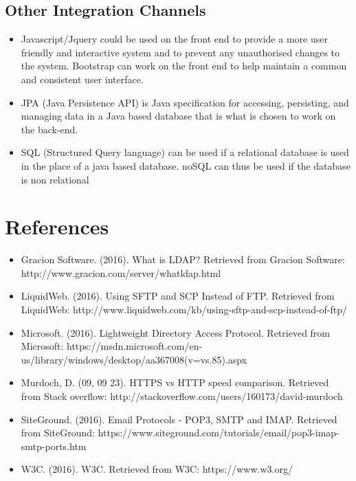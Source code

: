 \documentclass[12pt, letterpaper, twoside]{article}
\begin{document}
    \subsection{Other Integration Channels}
          \begin{itemize}
           \item Javascript/Jquery could be used on the front end to provide a more user friendly and interactive system and to prevent any unauthorised changes to the system. Bootstrap can work on the front end to help maintain a common and consistent user interface.
           \item JPA (Java Persistence API) is Java specification for accessing, persisting, and managing data in a Java based database that  is what is chosen to work on the back-end. 
           \item SQL (Structured Query language) can be used if a relational database is used in the place of a java based database. noSQL can thus be used if the database is non relational
          \end{itemize}
        \endsubsection{}
  \newpage
  \section{References}
  \begin{itemize}
  \item Gracion Software. (2016). What is LDAP? Retrieved from Gracion Software: http://www.gracion.com/server/whatldap.html
  \item LiquidWeb. (2016). Using SFTP and SCP Instead of FTP. Retrieved from LiquidWeb: http://www.liquidweb.com/kb/using-sftp-and-scp-instead-of-ftp/
  \item Microsoft. (2016). Lightweight Directory Access Protocol. Retrieved from Microsoft: https://msdn.microsoft.com/en-us/library/windows/desktop/aa367008(v=vs.85).aspx
  \item Murdoch, D. (09, 09 23). HTTPS vs HTTP speed comparison. Retrieved from Stack overflow: http://stackoverflow.com/users/160173/david-murdoch
  \item SiteGround. (2016). Email Protocols - POP3, SMTP and IMAP. Retrieved from SiteGround: https://www.siteground.com/tutorials/email/pop3-imap-smtp-ports.htm
  \item W3C. (2016). W3C. Retrieved from W3C: https://www.w3.org/
\end{itemize}
\end{document}
